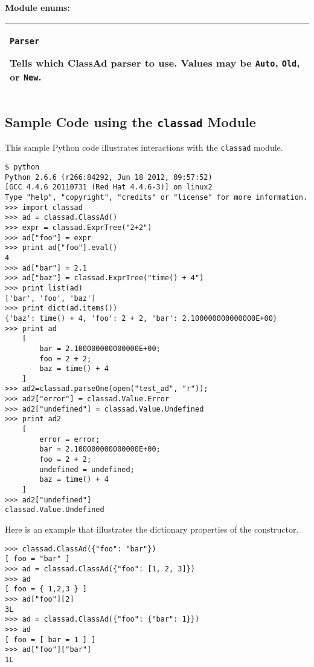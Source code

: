 \textbf{Module enums:}
\begin{flushleft}
\begin{longtable}{|p{16cm}|} \hline

\texttt{Parser}

Tells which ClassAd parser to use.
Values may be
\texttt{Auto},
\texttt{Old},
or \texttt{New}.

\\ \hline

\end{longtable}
\end{flushleft}

\subsection{\label{Python-ClassAd-Example} Sample Code using the \texttt{classad} Module}
This sample Python code illustrates interactions with the \texttt{classad} module. 

\footnotesize
\begin{verbatim}
$ python
Python 2.6.6 (r266:84292, Jun 18 2012, 09:57:52) 
[GCC 4.4.6 20110731 (Red Hat 4.4.6-3)] on linux2
Type "help", "copyright", "credits" or "license" for more information.
>>> import classad
>>> ad = classad.ClassAd()
>>> expr = classad.ExprTree("2+2")
>>> ad["foo"] = expr
>>> print ad["foo"].eval()
4
>>> ad["bar"] = 2.1
>>> ad["baz"] = classad.ExprTree("time() + 4")
>>> print list(ad)
['bar', 'foo', 'baz']
>>> print dict(ad.items())
{'baz': time() + 4, 'foo': 2 + 2, 'bar': 2.100000000000000E+00}
>>> print ad
    [
        bar = 2.100000000000000E+00; 
        foo = 2 + 2; 
        baz = time() + 4
    ]
>>> ad2=classad.parseOne(open("test_ad", "r"));
>>> ad2["error"] = classad.Value.Error
>>> ad2["undefined"] = classad.Value.Undefined
>>> print ad2
    [
        error = error; 
        bar = 2.100000000000000E+00; 
        foo = 2 + 2; 
        undefined = undefined; 
        baz = time() + 4
    ]
>>> ad2["undefined"]
classad.Value.Undefined

\end{verbatim}
\normalsize

Here is an example that illustrates the dictionary properties of
the constructor.
\footnotesize
\begin{verbatim}
>>> classad.ClassAd({"foo": "bar"})
[ foo = "bar" ]
>>> ad = classad.ClassAd({"foo": [1, 2, 3]})
>>> ad
[ foo = { 1,2,3 } ]
>>> ad["foo"][2]
3L
>>> ad = classad.ClassAd({"foo": {"bar": 1}})
>>> ad
[ foo = [ bar = 1 ] ]
>>> ad["foo"]["bar"]
1L

\end{verbatim}
\normalsize

